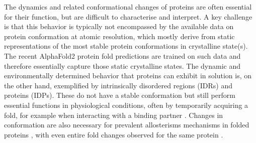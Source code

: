 The dynamics and related conformational changes of proteins are often essential for their function, but are difficult to characterise and interpret. A key challenge is that this behavior is typically not encompassed by the available data on protein conformation at atomic resolution, which mostly derive from static representations of the most stable protein conformations in crystalline state(s). The recent AlphaFold2 protein fold predictions are trained on such data and therefore essentially capture those static crystalline states. The dynamic and environmentally determined behavior that proteins can exhibit in solution is, on the other hand, exemplified by intrinsically disordered regions (IDRs) and proteins (IDPs). These do not have a stable conformation but still perform essential functions in physiological conditions, often by temporarily acquiring a fold, for example when interacting with a binding partner \cite{tompa_intrinsically_2012}. Changes in conformation are also necessary for prevalent \glspl{allosterism} mechanisms in folded proteins \cite{guo_protein_2016}, with even entire fold changes observed for the same protein \cite{pirchi_single-molecule_2011}.

